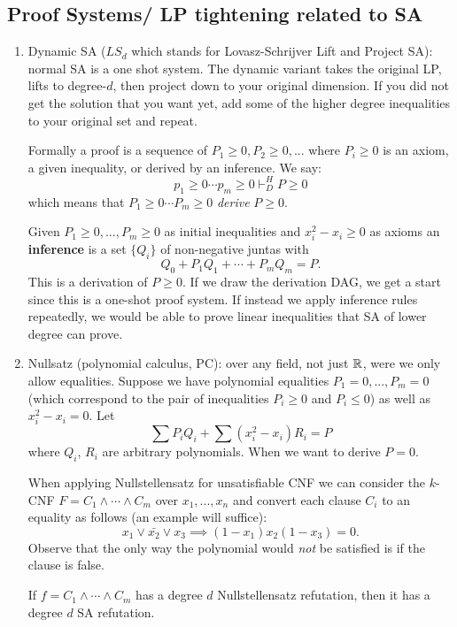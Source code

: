 \subsection{Proof Systems/ LP tightening related to SA}
\begin{enumerate}
\item Dynamic SA ($LS_d$ which stands for Lovasz-Schrijver Lift and Project SA): normal SA is a one shot system. The dynamic variant takes the original LP, lifts to degree-$d$, then project down to your original dimension. If you did not get the solution that you want yet, add some of the higher degree inequalities to your original set and repeat.

Formally a proof is a sequence of $P_1 \geq 0, P_2 \geq 0, ...$ where $P_i \geq 0$ is an axiom, a given inequality, or derived by an inference. We say:
\[p_1 \geq 0 \cdots p_m \geq 0 \vdash^{H}_{D} P \geq 0\]
which means that $P_1 \geq 0 \cdots P_m \geq 0$ \emph{derive} $P \geq 0$.

Given $P_1 \geq 0, ..., P_m \geq 0$ as initial inequalities and $x_i^2 - x_i \geq 0$ as axioms an \textbf{inference} is a set $\{Q_i\}$ of non-negative juntas with
\[Q_0 + P_1Q_1 + \cdots + P_mQ_m = P.\]
This is a derivation of $P \geq 0$. If we draw the derivation DAG, we get a start since this is a one-shot proof system. If instead we apply inference rules repeatedly, we would be able to prove linear inequalities that SA of lower degree can prove.
\item Nullsatz (polynomial calculus, PC): over any field, not just $\mathbb{R}$, were we only allow equalities. Suppose we have polynomial equalities $P_1 = 0, ..., P_m = 0$ (which correspond to the pair of inequalities $P_i \geq 0$ and $P_i \leq 0$) as well as $x_i^2 - x_i = 0$. Let
\[\sum P_iQ_i + \sum(x_i^2 - x_i)R_i = P\]
where $Q_i$, $R_i$ are arbitrary polynomials. When we want to derive $P = 0$.

When applying Nullstellensatz for unsatisfiable CNF we can consider the $k$-CNF $F = C_1 \land \cdots \land C_m$ over $x_1, ..., x_n$ and convert each clause $C_i$ to an equality as follows (an example will suffice):
\[x_1 \lor \bar{x_2} \lor x_3 \implies (1-x_1)x_2(1-x_3) = 0.\]
Observe that the only way the polynomial would \emph{not} be satisfied is if the clause is false. 

\begin{theorem}
If $f = C_1 \land \cdots \land C_m$ has a degree $d$ Nullstellensatz refutation, then it has a degree $d$ SA refutation.
\end{theorem}


\end{enumerate}
